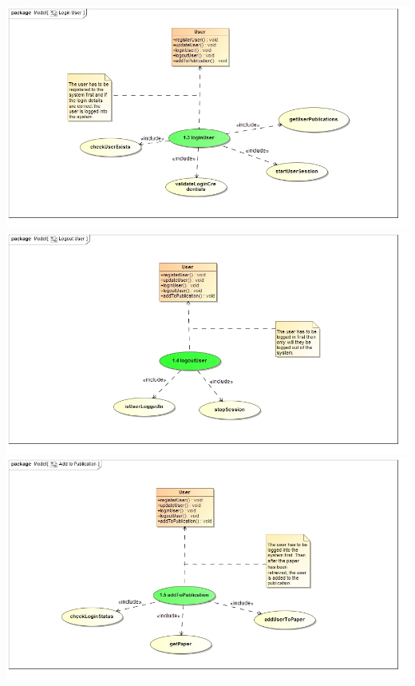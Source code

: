 \documentclass{article}
\begin{document}
				\includegraphics[width=\textwidth]{LoginUser}
				\includegraphics[width=\textwidth]{LogoutUser}
				\includegraphics[width=\textwidth]{AddtoPublication}
\end{document}
